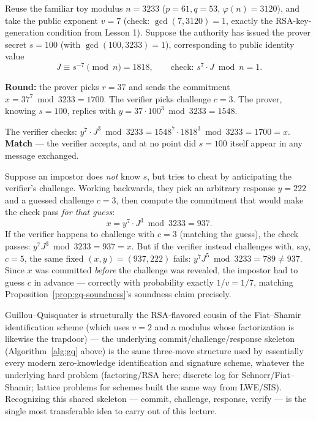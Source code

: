 \begin{example}
Reuse the familiar toy modulus $n = 3233$ ($p=61,q=53$, $\varphi(n)=3120$), and take the public exponent $v = 7$ (check: $\gcd(7,3120)=1$, exactly the RSA-key-generation condition from Lesson 1). Suppose the authority has issued the prover secret $s = 100$ (with $\gcd(100,3233)=1$), corresponding to public identity value
\[
J \equiv s^{-7} \pmod n = 1818, \qquad \text{check: } s^{7} \cdot J \bmod n = 1.
\]

\textbf{Round:} the prover picks $r = 37$ and sends the commitment $x = 37^{7} \bmod 3233 = 1700$. The verifier picks challenge $c = 3$. The prover, knowing $s=100$, replies with $y = 37 \cdot 100^{3} \bmod 3233 = 1548$.

The verifier checks: $y^{7} \cdot J^{3} \bmod 3233 = 1548^7 \cdot 1818^3 \bmod 3233 = 1700 = x$. \textbf{Match} — the verifier accepts, and at no point did $s=100$ itself appear in any message exchanged.
\end{example}

\begin{example}
Suppose an impostor does \emph{not} know $s$, but tries to cheat by anticipating the verifier's challenge. Working backwards, they pick an arbitrary response $y=222$ and a guessed challenge $c=3$, then compute the commitment that would make the check pass \emph{for that guess}:
\[
x = y^{7} \cdot J^{3} \bmod 3233 = 937.
\]
If the verifier happens to challenge with $c=3$ (matching the guess), the check passes: $y^7 J^3 \bmod 3233 = 937 = x$. But if the verifier instead challenges with, say, $c=5$, the same fixed $(x,y)=(937,222)$ fails: $y^7 J^5 \bmod 3233 = 789 \ne 937$. Since $x$ was committed \emph{before} the challenge was revealed, the impostor had to guess $c$ in advance — correctly with probability exactly $1/v = 1/7$, matching Proposition~\ref{prop:gq-soundness}'s soundness claim precisely.
\end{example}

\begin{remark}
Guillou--Quisquater is structurally the RSA-flavored cousin of the Fiat--Shamir identification scheme (which uses $v=2$ and a modulus whose factorization is likewise the trapdoor) — the underlying commit/challenge/response skeleton (Algorithm~\ref{alg:gq} above) is the same three-move structure used by essentially every modern zero-knowledge identification and signature scheme, whatever the underlying hard problem (factoring/RSA here; discrete log for Schnorr/Fiat--Shamir; lattice problems for schemes built the same way from LWE/SIS). Recognizing this shared skeleton — commit, challenge, response, verify — is the single most transferable idea to carry out of this lecture.
\end{remark}

